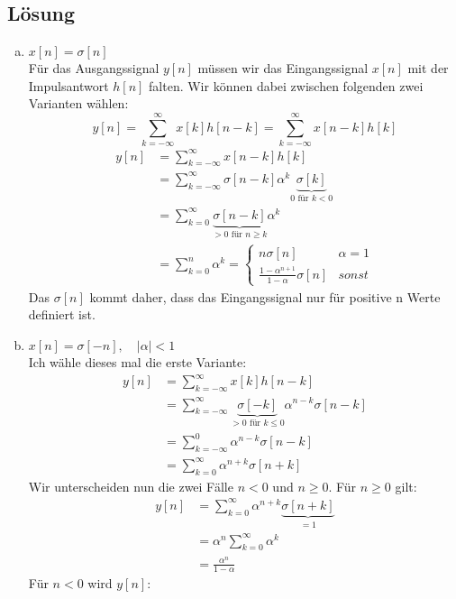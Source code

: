 \subsection*{Lösung}
	\begin{enumerate}[a)]
		\item $x[n]=\sigma [n]$ \\
			Für das Ausgangssignal $y[n]$ müssen wir das Eingangssignal $x[n]$ mit der Impulsantwort $h[n]$ falten. Wir können dabei zwischen folgenden zwei Varianten wählen:
			\[
				y[n] = \sum_{k=-\infty}^{\infty}x[k]h[n-k]=\sum_{k=-\infty}^{\infty}x[n-k]h[k]
			\]
			\begin{align*}
				y[n]	&= \sum_{k=-\infty}^{\infty}x[n-k]h[k] \\
						&= \sum_{k=-\infty}^{\infty}\sigma [n-k] \alpha^k \underbrace{\sigma [k]}_{0 \text{ für } k<0} \\
						&= \sum_{k=0}^{\infty}\underbrace{\sigma [n-k]}_{>0 \text{ für } n \ge k} \alpha^k \\
						&= \sum_{k=0}^{n} \alpha^k = \left\{ \begin{array}{ll} n\sigma [n] & \alpha=1\\ \frac{1-\alpha^{n+1}}{1-\alpha}\sigma [n] & sonst \end{array} \right.
			\end{align*}
			Das $\sigma [n]$ kommt daher, dass das Eingangssignal nur für positive n Werte definiert ist.
		\item $x[n]=\sigma [-n], \quad |\alpha|<1$ \\
			Ich wähle dieses mal die erste Variante:
			\begin{align*}
				y[n]	&= \sum_{k=-\infty}^{\infty}x[k]h[n-k] \\
						&= \sum_{k=-\infty}^{\infty}\underbrace{\sigma [-k]}_{>0 \text{ für } k \le 0} \alpha ^{n-k} \sigma [n-k] \\
						&= \sum_{k=-\infty}^{0}\alpha^{n-k} \sigma [n-k] \\
						&= \sum_{k=0}^{\infty}\alpha^{n+k} \sigma [n+k]
			\end{align*}
			Wir unterscheiden nun die zwei Fälle $n<0$ und $n \ge 0$. Für $n \ge 0$ gilt:
			\begin{align*}
				y[n]	&= \sum_{k=0}^{\infty}\alpha^{n+k} \underbrace{\sigma [n+k]}_{=1} \\
						&= \alpha ^n \sum_{k=0}^{\infty}\alpha^{k} \\
						&= \frac{\alpha ^n}{1-\alpha}
			\end{align*}
			Für $n<0$ wird $y[n]$:

\end{enumerate}
